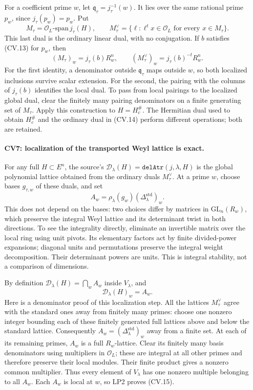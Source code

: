 \documentclass[11pt,a4paper]{article}
\numberwithin{equation}{section}
\theoremstyle{remark}\newtheorem{remark}[theorem]{Remark}
\begin{document}
For a coefficient prime \(w\), let
\(\mathfrak q_\tau=j_\tau^{-1}(w)\).
It lies over the same rational prime \(p_w\), since
\(j_\tau(p_w)=p_w\). Put
\[
 M_\tau=\mathcal O_L\text{-span}\,j_\tau(H),\qquad
 M_\tau^\vee=\{\ell:\ell^tx\in\mathcal O_L
                                  \text{ for every }x\in M_\tau\}.
\]
This last dual is the ordinary linear dual, with no
conjugation. If \(b\) satisfies (CV.13) for \(p_w\), then
\[
 (M_\tau)_w=j_\tau(b)R_w^n,\qquad
 (M_\tau^\vee)_w=j_\tau(b)^{-t}R_w^n.                          \tag{CV.14}
\]
For the first identity, a denominator outside
\(\mathfrak q_\tau\) maps outside \(w\), so both localized
inclusions survive scalar extension. For the second, the
pairing with the columns of \(j_\tau(b)\) identifies the
local dual. To pass from local pairings to the localized
global dual, clear the finitely many pairing denominators
on a finite generating set of \(M_\tau\).
Apply this construction to \(H=H_c^\#\).
The Hermitian dual used to obtain \(H_c^\#\) and the
ordinary dual in (CV.14) perform different operations;
both are retained.

\paragraph{CV7: localization of the transported Weyl lattice is exact.}
For any full \(H\subset E^n\), the source's
\(\mathcal D_\lambda(H)=\texttt{delAtr}(j,\lambda,H)\)
is the global polynomial lattice obtained from the ordinary
duals \(M_\tau^\vee\). At a prime \(w\), choose bases
\(g_{\tau,w}\) of these duals, and set
\[
 A_w=\rho_\lambda(g_w)
                      (\Delta_\lambda^{\mathrm{std}})_w.
\]
This does not depend on the bases: two choices differ by
matrices in \(\mathrm{GL}_n(R_w)\), which preserve the
integral Weyl lattice and its determinant twist in both
directions. To see the integrality directly, eliminate
an invertible matrix over the local ring using unit pivots.
Its elementary factors act by finite divided-power
expansions; diagonal units and permutations preserve the
integral weight decomposition. Their determinant powers
are units. This is integral stability, not a comparison
of dimensions.

By definition \(\mathcal D_\lambda(H)=\bigcap_w A_w\)
inside \(V_\lambda\), and
\[
                   \mathcal D_\lambda(H)_w=A_w.              \tag{CV.15}
\]
Here is a denominator proof of this localization step.
All the lattices \(M_\tau^\vee\) agree with the standard
ones away from finitely many primes: choose one nonzero
integer bounding each of these finitely generated full
lattices above and below the standard lattice.
Consequently \(A_w=(\Delta_\lambda^{\mathrm{std}})_w\)
away from a finite set. At each of its remaining primes,
\(A_w\) is a full \(R_w\)-lattice. Clear its finitely many
basis denominators using multipliers in \(\mathcal O_L\);
these are integral at all other primes and therefore
preserve their local modules. Their finite product gives
a nonzero common multiplier.
Thus every element of \(V_\lambda\) has one nonzero
multiple belonging to all \(A_w\). Each \(A_w\) is local
at \(w\), so LP2 proves (CV.15).
\end{document}

